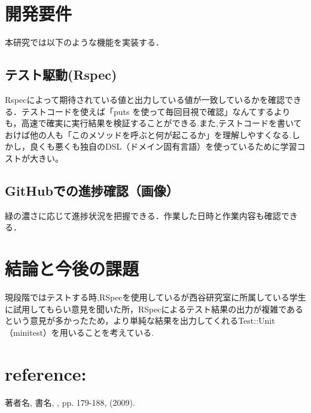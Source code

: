 \documentclass[a4j,twocolumn,uplatex]{jsarticle}
\begin{document}
\section{開発要件}
本研究では以下のような機能を実装する．

\subsection{テスト駆動(Rspec)}
Rspecによって期待されている値と出力している値が一致しているかを確認できる．テストコードを使えば「puts を使って毎回目視で確認」なんてするよりも，高速で確実に実行結果を検証することができる.また,テストコードを書いておけば他の人も「このメソッドを呼ぶと何が起こるか」を理解しやすくなる.しかし，良くも悪くも独自のDSL（ドメイン固有言語）を使っているために学習コストが大きい。

\subsection{GitHubでの進捗確認（画像）}
緑の濃さに応じて進捗状況を把握できる．作業した日時と作業内容も確認できる．

\section{結論と今後の課題}
現段階ではテストする時,RSpecを使用しているが西谷研究室に所属している学生に試用してもらい意見を聞いた所，RSpecによるテスト結果の出力が複雑であるという意見が多かったため，より単純な結果を出力してくれるTest::Unit（minitest）を用いることを考えている.

\section{reference:}


\renewcommand{\bibname}{参考文献}
\begin{thebibliography}{1}

著者名,
\newblock 書名,
, pp. 179-188, (2009).


\end{thebibliography}
\end{document}

